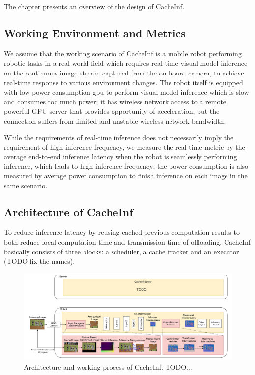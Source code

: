 The chapter presents an overview of the design of CacheInf.

\subsection*{Working Environment and Metrics}
We assume that the working scenario of CacheInf is a mobile robot performing robotic tasks in a real-world field which requires real-time visual model inference on the continuous image stream captured from the on-board camera, to achieve real-time response to various environment changes.
The robot itself is equipped with low-power-consumption gpu to perform visual model inference which is slow and consumes too much power; it has wireless network access to a remote powerful GPU server that provides opportunity of acceleration, but the connection suffers from limited and unstable wireless network bandwidth.

While the requirements of real-time inference does not necessarily imply the requirement of high inference frequency, we measure the real-time metric by the average end-to-end inference latency when the robot is seamlessly performing inference, which leads to high inference frequency; the power consumption is also measured by average power consumption to finish inference on each image in the same scenario.

\subsection{Architecture of CacheInf}
To reduce inference latency by reusing cached previous computation results to both reduce local computation time and transmission time of offloading, CacheInf basically consists of three blocks: a scheduler, a cache tracker and an executor (TODO fix the names).

\begin{figure}[!htb]
    \centering
    \includegraphics[width=\linewidth]{fig/overview.pdf}
    \caption[track]{Architecture and working process of CacheInf. TODO...}
    \label{fig:overview}
\end{figure}

